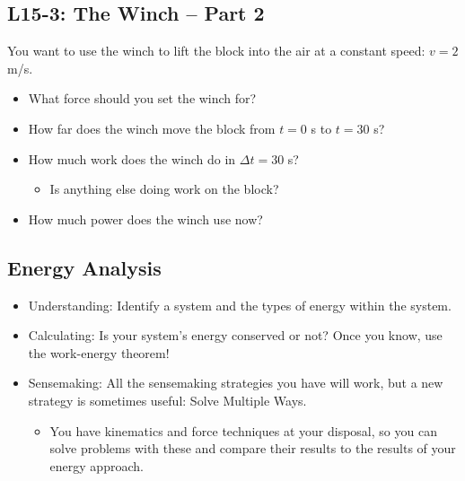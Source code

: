 \documentclass[]{article}
\newcommand{\Week}{15}
\begin{document}
\begin{PresentSpace}
\vspace{-10pt}
\section*{L\Week-3: The Winch -- Part 2}
\vspace{-10pt}
You want to use the winch to lift the block into the air at a constant speed: $v=2$ m/s.
\begin{itemize}
	\item What force should you set the winch for?
	\item How far does the winch move the block from $t=0$ s to $t=30$ s?
	\item How much work does the winch do in $\Delta t = 30$ s?
	\begin{itemize}
		\item Is anything else doing work on the block?
	\end{itemize}
	\item How much power does the winch use now?
\end{itemize}
\end{PresentSpace}
\newpage
\begin{TeacherMargin}

\end{TeacherMargin}
\begin{PresentSpace}
\vspace{-10pt}
\section*{Energy Analysis}
\vspace{-10pt}
\begin{itemize}
	\item Understanding: Identify a system and the types of energy within the system.
	\item Calculating: Is your system's energy conserved or not? Once you know, use the work-energy theorem!
	\item Sensemaking: All the sensemaking strategies you have will work, but a new strategy is sometimes useful: Solve Multiple Ways.
	\begin{itemize}
		\item You have kinematics and force techniques at your disposal, so you can solve problems with these and compare their results to the results of your energy approach.
	\end{itemize}
\end{itemize}
\end{PresentSpace}
\end{document}
